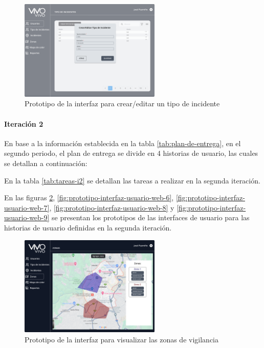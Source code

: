 \begin{figure}[H]
      \centering
      \includegraphics[width=0.6\textwidth]{chapters/III-resultados-y-discusion/resources/images/prototipo-formulario-tipo-incidente-web.png}
      \caption{Prototipo de la interfaz para crear/editar un tipo de incidente}
      \label{fig:prototipo-interfaz-usuario-web-2}
\end{figure}


\paragraph{Iteración 2}

En base a la información establecida en la tabla \ref{tab:plan-de-entrega}, en el segundo periodo, el plan de
entrega se divide en 4 historias de usuario, las cuales se detallan a continuación:



En la tabla \ref{tab:tareas-i2} se detallan las tareas a realizar en la segunda iteración.



En las figuras \ref{fig:prototipo-interfaz-usuario-web-5}, \ref{fig:prototipo-interfaz-usuario-web-6},
\ref{fig:prototipo-interfaz-usuario-web-7}, \ref{fig:prototipo-interfaz-usuario-web-8} y
\ref{fig:prototipo-interfaz-usuario-web-9} se presentan los prototipos de las interfaces de usuario para las
historias de usuario definidas en la segunda iteración.

\begin{figure}[H]
      \centering
      \includegraphics[width=0.6\textwidth]{chapters/III-resultados-y-discusion/resources/images/prototipo-mapa-zonas-de-vigilancia-web.png}
      \caption{Prototipo de la interfaz para visualizar las zonas de vigilancia}
      \label{fig:prototipo-interfaz-usuario-web-5}
\end{figure}

